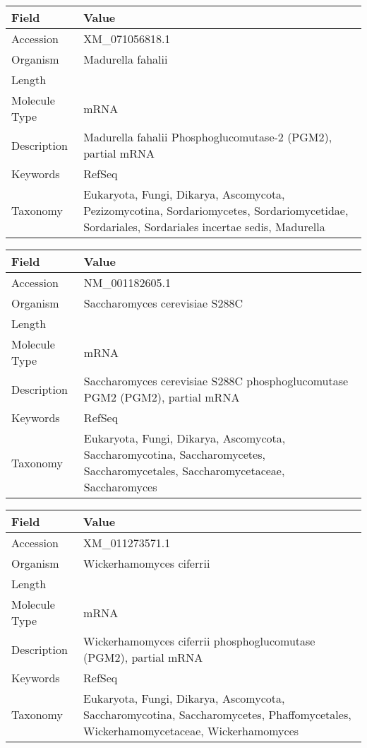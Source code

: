 \documentclass[10pt]{article}
\begin{document}
\vspace{1em}
{\footnotesize
\begin{longtable}{>{\raggedright\arraybackslash}p{4.5cm} >{\raggedright\arraybackslash}p{11.5cm}}
\textbf{Field} & \textbf{Value} \\
\hline
Accession & XM\_071056818.1 \\
Organism & Madurella fahalii \\
Length & 1665 \\
Molecule Type & mRNA \\
Description & Madurella fahalii Phosphoglucomutase-2 (PGM2), partial mRNA \\
Keywords & RefSeq \\
Taxonomy & Eukaryota, Fungi, Dikarya, Ascomycota, Pezizomycotina, Sordariomycetes, Sordariomycetidae, Sordariales, Sordariales incertae sedis, Madurella \\
\end{longtable}
}

\vspace{1em}
{\footnotesize
\begin{longtable}{>{\raggedright\arraybackslash}p{4.5cm} >{\raggedright\arraybackslash}p{11.5cm}}
\textbf{Field} & \textbf{Value} \\
\hline
Accession & NM\_001182605.1 \\
Organism & Saccharomyces cerevisiae S288C \\
Length & 1710 \\
Molecule Type & mRNA \\
Description & Saccharomyces cerevisiae S288C phosphoglucomutase PGM2 (PGM2), partial mRNA \\
Keywords & RefSeq \\
Taxonomy & Eukaryota, Fungi, Dikarya, Ascomycota, Saccharomycotina, Saccharomycetes, Saccharomycetales, Saccharomycetaceae, Saccharomyces \\
\end{longtable}
}

\vspace{1em}
{\footnotesize
\begin{longtable}{>{\raggedright\arraybackslash}p{4.5cm} >{\raggedright\arraybackslash}p{11.5cm}}
\textbf{Field} & \textbf{Value} \\
\hline
Accession & XM\_011273571.1 \\
Organism & Wickerhamomyces ciferrii \\
Length & 1695 \\
Molecule Type & mRNA \\
Description & Wickerhamomyces ciferrii phosphoglucomutase (PGM2), partial mRNA \\
Keywords & RefSeq \\
Taxonomy & Eukaryota, Fungi, Dikarya, Ascomycota, Saccharomycotina, Saccharomycetes, Phaffomycetales, Wickerhamomycetaceae, Wickerhamomyces \\
\end{longtable}
}
\end{document}
